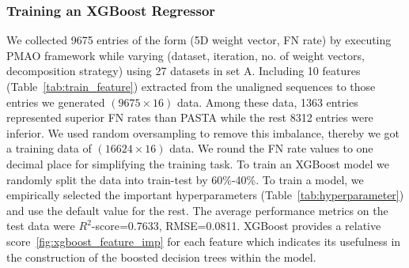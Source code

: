 \graphicspath{{pmao/supp/Figure/}}
\subsubsection{Training an XGBoost Regressor} \label{appendix:train_xgboost}
We collected 9675 entries of the form (5D weight vector, FN rate) by executing PMAO framework while varying (dataset, iteration, no. of weight vectors, decomposition strategy) using 27 datasets in set A. Including 10 features (Table~\ref{tab:train_feature}) extracted from the unaligned sequences to those entries we generated $(9675 \times 16)$ data. Among these data, 1363 entries represented superior FN rates than PASTA while the rest 8312 entries were inferior. We used random oversampling to remove this imbalance, thereby we got a training data of $(16624 \times 16)$ data. We round the FN rate values to one decimal place for simplifying the training task. To train an XGBoost model we randomly split the data into train-test by 60\%-40\%. To train a model, we empirically selected the important hyperparameters (Table~\ref{tab:hyperparameter}) and use the default value for the rest. The average performance metrics on the test data were $R^2$-score=0.7633, RMSE=0.0811. XGBoost provides a relative score~\ref{fig:xgboost_feature_imp} for each feature which
indicates its usefulness in the construction
of the boosted decision trees within the model.



